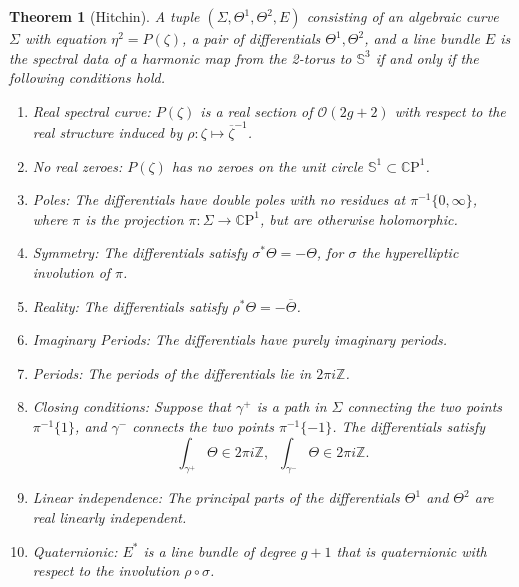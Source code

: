 \documentclass{article}
\numberwithin{equation}{section}
\numberwithin{figure}{section}
\newtheorem{thm}[equation]{Theorem}
\renewcommand*{\bar}{\overline}
\newcommand{\iu}{i}
\newcommand{\Z}{\mathbb{Z}}
\newcommand{\CP}{\mathbb{C}\text{P}}
\renewcommand{\S}{\mathbb{S}}
\begin{document}
\begin{thm}[Hitchin]\label{thm:Hitchin}
A tuple $(\Sigma,\Theta^1,\Theta^2,E)$ consisting of an algebraic curve $\Sigma$ with equation $\eta^2 = P(\zeta)$, a pair of differentials $\Theta^1, \Theta^2$, and a line bundle $E$ is the \emph{spectral data} of a harmonic map from the 2-torus to $\S^3$ if and only if the following conditions hold.
\begin{enumerate}[label=(P.\arabic*)]
\item\label{P:real curve} Real spectral curve: $P(\zeta)$ is a real section of $\mathcal{O}(2g+2)$ with respect to the real structure induced by $\rho : \zeta \mapsto \bar{\zeta}^{-1}$.
\item\label{P:no real zeroes} No real zeroes: $P(\zeta)$ has no zeroes on the unit circle $\S^1\subset\CP^1$.
\item\label{P:poles} Poles: The differentials have double poles with no residues at $\pi^{-1}\{0,\infty\}$, where $\pi$ is the projection $\pi: \Sigma \to \CP^1$, but are otherwise holomorphic.
\item\label{P:symmetry} Symmetry: The differentials satisfy $\sigma^* \Theta = - \Theta$, for $\sigma$ the hyperelliptic involution of $\pi$.
\item\label{P:reality} Reality: The differentials satisfy $\rho^* \Theta = - \bar{\Theta}$.
\item\label{P:imaginary periods} Imaginary Periods: The differentials have purely imaginary periods.
\item\label{P:periods} Periods: The periods of the differentials lie in $2\pi\iu\Z$.
\item\label{P:closing} Closing conditions: Suppose that $\gamma^+$ is a path in $\Sigma$ connecting the two points $\pi^{-1}\{1\}$, and $\gamma^-$ connects the two points $\pi^{-1}\{-1\}$. The differentials satisfy
\[
\int_{\gamma^+}\Theta \in 2\pi\iu\Z,\;\; 
\int_{\gamma^-}\Theta \in 2\pi\iu\Z.
\]
\item\label{P:linear independence} Linear independence: The principal parts of the differentials $\Theta^1$ and $\Theta^2$ are real linearly independent.
\item\label{P:quaternionic} Quaternionic: $E^*$ is a line bundle of degree $g+1$ that is quaternionic with respect to the involution $\rho \circ \sigma$.
\end{enumerate}
\end{thm}
\end{document}
